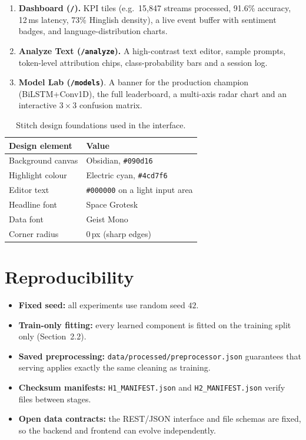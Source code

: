 \documentclass[11pt,a4paper]{article}
\begin{document}
\begin{enumerate}
    \item \textbf{Dashboard (\texttt{/}).} KPI tiles (e.g.\ 15,847 streams processed, 91.6\% accuracy, 12\,ms latency, 73\% Hinglish density), a live event buffer with sentiment badges, and language-distribution charts.
    \item \textbf{Analyze Text (\texttt{/analyze}).} A high-contrast text editor, sample prompts, token-level attribution chips, class-probability bars and a session log.
    \item \textbf{Model Lab (\texttt{/models})}. A banner for the production champion (BiLSTM+Conv1D), the full leaderboard, a multi-axis radar chart and an interactive $3\times3$ confusion matrix.
\end{enumerate}

\begin{table}[htbp]
\centering
\small
\begin{tabular}{ll}
\toprule
\textbf{Design element} & \textbf{Value} \\
\midrule
Background canvas & Obsidian, \texttt{\#090d16} \\
Highlight colour  & Electric cyan, \texttt{\#4cd7f6} \\
Editor text       & \texttt{\#000000} on a light input area \\
Headline font     & Space Grotesk \\
Data font         & Geist Mono \\
Corner radius     & 0\,px (sharp edges) \\
\bottomrule
\end{tabular}
\caption{Stitch design foundations used in the interface.}
\end{table}

\section{Reproducibility}

\begin{itemize}
    \item \textbf{Fixed seed:} all experiments use random seed $42$.
    \item \textbf{Train-only fitting:} every learned component is fitted on the training split only (Section~2.2).
    \item \textbf{Saved preprocessing:} \texttt{data/processed/preprocessor.json} guarantees that serving applies exactly the same cleaning as training.
    \item \textbf{Checksum manifests:} \texttt{H1\_MANIFEST.json} and \texttt{H2\_MANIFEST.json} verify files between stages.
    \item \textbf{Open data contracts:} the REST/JSON interface and file schemas are fixed, so the backend and frontend can evolve independently.
\end{itemize}
\end{document}
